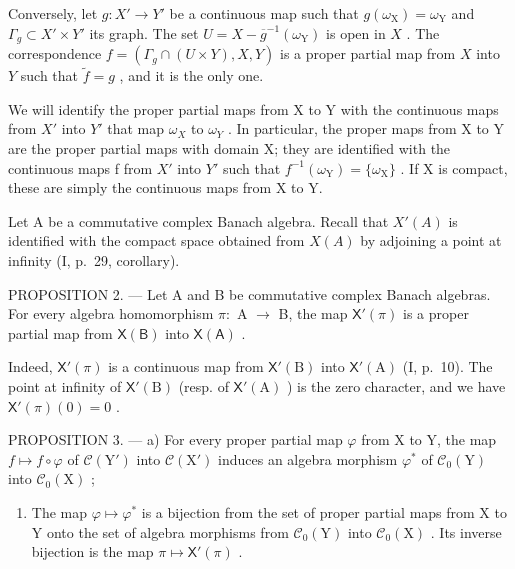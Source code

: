 Conversely, let \(g \colon X' \to Y'\) be a continuous map such that \(g(\omega_{\mathrm{X}}) = \omega_{\mathrm{Y}}\) and \(\Gamma_g \subset X' \times Y'\) its graph. The set \(U = X - \overline{g}^{-1}(\omega_{\mathrm{Y}})\) is open in \(X\) . The correspondence \(f = (\Gamma_g \cap (U \times Y), X, Y)\) is a proper partial map from \(X\) into \(Y\) such that \(\widetilde{f} = g\) , and it is the only one.

We will identify the proper partial maps from X to Y with the continuous maps from \(X'\) into \(Y'\) that map \(\omega_{X}\) to \(\omega_{Y}\) . In particular, the proper maps from X to Y are the proper partial maps with domain X; they are identified with the continuous maps f from \(X'\) into \(Y'\) such that \(f^{-1}(\omega_{\mathrm{Y}}) = \{\omega_{\mathrm{X}}\}\) . If X is compact, these are simply the continuous maps from X to Y.

Let A be a commutative complex Banach algebra. Recall that \(X'(A)\) is identified with the compact space obtained from \(X(A)\) by adjoining a point at infinity (I, p.~29, corollary).

PROPOSITION 2. --- Let A and B be commutative complex Banach algebras. For every algebra homomorphism \(\pi\colon\) A \(\to\) B, the map \(\mathsf{X}'(\pi)\) is a proper partial map from \(\mathsf{X}(\mathsf{B})\) into \(\mathsf{X}(\mathsf{A})\) .

Indeed, \(\mathsf{X}'(\pi)\) is a continuous map from \(\mathsf{X}'(\mathrm{B})\) into \(\mathsf{X}'(\mathrm{A})\) (I, p.~10). The point at infinity of \(\mathsf{X}'(\mathrm{B})\) (resp. of \(\mathsf{X}'(\mathrm{A})\) ) is the zero character, and we have \(\mathsf{X}'(\pi)(0)=0\) .

PROPOSITION 3. --- a) For every proper partial map \(\varphi\) from X to Y, the map \(f \mapsto f \circ \varphi\) of \(\mathcal{C}(\mathrm{Y}')\) into \(\mathcal{C}(\mathrm{X}')\) induces an algebra morphism \(\varphi^*\) of \(\mathcal{C}_0(\mathrm{Y})\) into \(\mathcal{C}_0(\mathrm{X})\) ;

\begin{enumerate}
\def\labelenumi{\alph{enumi})}
\setcounter{enumi}{1}
\tightlist
\item
  The map \(\varphi \mapsto \varphi^{*}\) is a bijection from the set of proper partial maps from X to Y onto the set of algebra morphisms from \(\mathcal{C}_0(\mathrm{Y})\) into \(\mathcal{C}_0(\mathrm{X})\) . Its inverse bijection is the map \(\pi \mapsto \mathsf{X}'(\pi)\) .
\end{enumerate}

